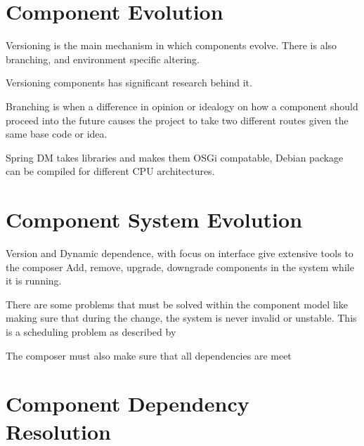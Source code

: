 \section{Component Evolution}
Versioning is the main mechanism in which components evolve.
There is also branching, and environment specific altering.

Versioning components has significant research behind it.

Branching is when a difference in opinion or idealogy on how a component should proceed into the future
causes the project to take two different routes given the same base code or idea.

Spring DM takes libraries and makes them OSGi compatable, 
Debian package can be compiled for different CPU architectures.


\section{Component System Evolution}
Version and Dynamic dependence, with focus on interface give extensive tools to the composer 
Add, remove, upgrade, downgrade components in the system while it is running.

There are some problems that must be solved within the component model like making sure that during the change,
the system is never invalid or unstable. 
This is a scheduling problem as described by %

The composer must also make sure that all dependencies are meet

\section{Component Dependency Resolution}

